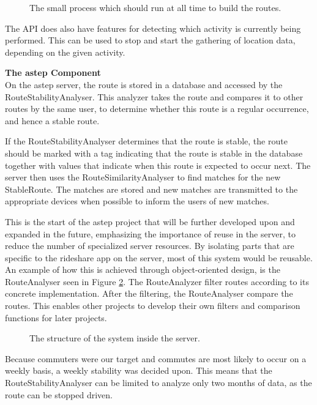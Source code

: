 \begin{figure}[h]
	\centering
	
	\caption{The small process which should run at all time to build the routes.}
	\label{fig:classDiagramSprint1Observer}
\end{figure}

The API does also have features for detecting which activity is currently being performed.
This can be used to stop and start the gathering of location data, depending on the given activity.

\textbf{The \gls{astep} Component}\\
On the \gls{astep} server, the route is stored in a database and accessed by the RouteStabilityAnalyser.
This analyzer takes the route and compares it to other routes by the same user, to determine whether this route is a regular occurrence, and hence a stable route.

If the RouteStabilityAnalyser determines that the route is stable, the route should be marked with a tag indicating that the route is stable in the database together with values that indicate when this route is expected to occur next.
The server then uses the RouteSimilarityAnalyser to find matches for the new StableRoute.
The matches are stored and new matches are transmitted to the appropriate devices when possible to inform the users of new matches.

%	

This is the start of the \gls{astep} project that will be further developed upon and expanded in the future, emphasizing the importance of reuse in the server, to reduce the number of specialized server resources.
By isolating parts that are specific to the rideshare app on the server, most of this system would be reusable.
An example of how this is achieved through object-oriented design, is the RouteAnalyser seen in Figure \ref{fig:classDiagramSprint1Server}.
The RouteAnalyzer filter routes according to its concrete implementation.
After the filtering, the RouteAnalyser compare the routes.
This enables other projects to develop their own filters and comparison functions for later projects.

\begin{figure}[h!]
	\centering
	
	\caption{The structure of the system inside the server.}
	\label{fig:classDiagramSprint1Server}
\end{figure}

Because commuters were our target and commutes are most likely to occur on a weekly basis, a weekly stability was decided upon.
This means that the RouteStabilityAnalyser can be limited to analyze only two months of data, as the route can be stopped driven.